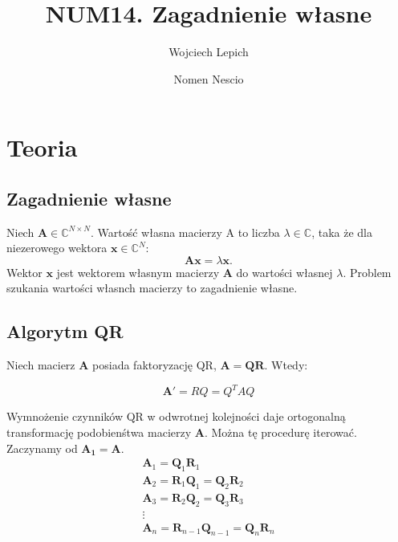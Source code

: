 \documentclass[a4paper,11pt]{article}
\author{Wojciech Lepich \and Nomen Nescio}
\title{NUM14. Zagadnienie własne}
\begin{document}
\maketitle

\section{Teoria}

\subsection{Zagadnienie własne}

Niech \(\mathbf{A} \in \mathbb{C}^{N\times N} \). Wartość własna macierzy A
to liczba \(\lambda \in \mathbb{C}\), taka że dla niezerowego wektora
\(\mathbf{x} \in \mathbb{C}^{N}\):
\begin{equation}
    \mathbf{A}\mathbf{x} = \lambda\mathbf{x}.
\end{equation}
Wektor \(\mathbf{x}\) jest wektorem własnym macierzy \(\mathbf{A}\) do wartości
własnej \(\lambda \). Problem szukania wartości własnch macierzy to
zagadnienie własne.

\subsection{Algorytm QR}

Niech macierz \(\mathbf{A}\) posiada faktoryzację QR, \(\mathbf{A = QR}\).
Wtedy:

\begin{equation}
    \mathbf{A}' = RQ = Q^T AQ    
\end{equation}

Wymnożenie czynników QR w odwrotnej kolejności daje ortogonalną transformację
podobienśtwa macierzy \(\mathbf{A}\). Można tę procedurę iterować. Zaczynamy
od \(\mathbf{A_1 = A}\).
\begin{equation}
    \begin{aligned}
        \mathbf{A}_1 = \mathbf{Q}_1\mathbf{R}_1 \\
        \mathbf{A}_2 = \mathbf{R}_1\mathbf{Q}_1 = \mathbf{Q}_2\mathbf{R}_2 \\
        \mathbf{A}_3 = \mathbf{R}_2\mathbf{Q}_2 = \mathbf{Q}_3\mathbf{R}_3 \\
        \vdots \\
        \mathbf{A}_n = \mathbf{R}_{n-1}\mathbf{Q}_{n-1} = \mathbf{Q}_n\mathbf{R}_n
    \end{aligned}
\end{equation}
\end{document}
